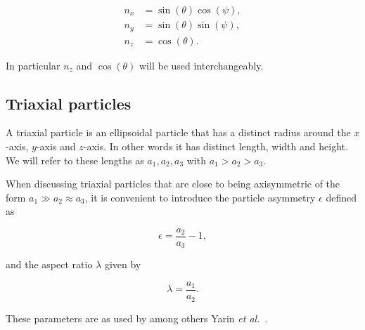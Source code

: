 \begin{subequations}\label{eq:nzEq}
\begin{align}
n_x 	&= \sin(\theta)\cos(\psi), \\
n_y 	&= \sin(\theta)\sin(\psi),\\
n_z		&= \cos(\theta).
\end{align}
\end{subequations}

\noindent In particular $n_z$ and $\cos(\theta)$ will be used interchangeably.

\subsection{Triaxial particles}
A triaxial particle is an ellipsoidal particle that has a distinct radius around the $x$-axis, $y$-axis and $z$-axis. In other words it has distinct length, width and height. We will refer to these lengths as $a_1, a_2, a_3$ with $a_1 > a_2 > a_3$.


When discussing triaxial particles that are close to being axisymmetric of the form $a_1 \gg a_2 \approx a_3$, it is convenient to introduce the particle asymmetry $\epsilon$ defined as

\begin{equation}\label{eq:epsilon}
\epsilon = \frac{a_2}{a_3} - 1,
\end{equation}

\noindent and the aspect ratio $\lambda$ given by

\begin{equation}\label{eq:lambda}
\lambda = \frac{a_1}{a_2}.
\end{equation}

These parameters are as used by among others Yarin \emph{et al.}~\cite{Yarin}.



